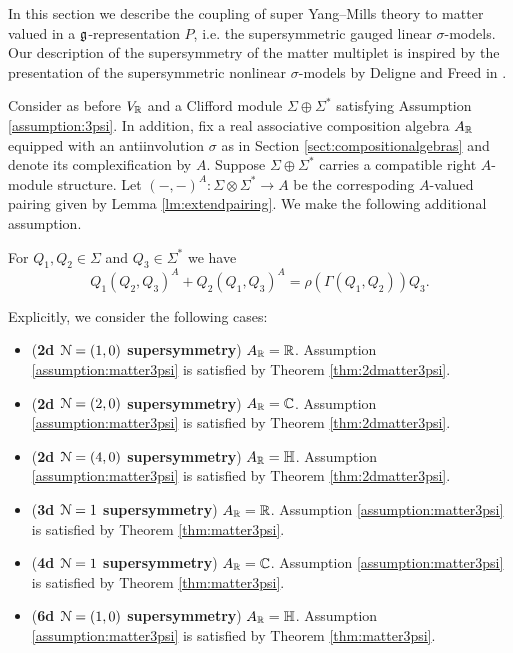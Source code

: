 \documentclass[10pt, oneside]{article}
\begin{document}
In this section we describe the coupling of super Yang--Mills theory to matter valued in a $\mathfrak g$-representation $P$, i.e. the supersymmetric gauged linear $\sigma$-models. Our description of the supersymmetry of the matter multiplet is inspired by the presentation of the supersymmetric nonlinear $\sigma$-models by Deligne and Freed in \cite[Chapter 3]{DeligneFreed}.

Consider as before $V_\mathbb R$ and a Clifford module $\Sigma\oplus \Sigma^*$ satisfying Assumption \ref{assumption:3psi}. In addition, fix a real associative composition algebra $A_\mathbb R$ equipped with an antiinvolution $\sigma$ as in Section \ref{sect:compositionalgebras} and denote its complexification by $A$. Suppose $\Sigma\oplus \Sigma^*$ carries a compatible right $A$-module structure. Let $(-, -)^A\colon \Sigma\otimes \Sigma^*\rightarrow A$ be the correspoding $A$-valued pairing given by Lemma \ref{lm:extendpairing}. We make the following additional assumption.

\begin{assumption}
For $Q_1, Q_2\in\Sigma$ and $Q_3\in\Sigma^*$ we have
\[Q_1(Q_2, Q_3)^A + Q_2(Q_1, Q_3)^A = \rho(\Gamma(Q_1, Q_2))Q_3.\]
\label{assumption:matter3psi}
\end{assumption}

Explicitly, we consider the following cases:
\begin{itemize}
\item (\textbf{2d $\mathcal N=(1, 0)$ supersymmetry}) $A_\mathbb R = \mathbb R$. Assumption \ref{assumption:matter3psi} is satisfied by Theorem \ref{thm:2dmatter3psi}.

\item (\textbf{2d $\mathcal N=(2, 0)$ supersymmetry}) $A_\mathbb R = \mathbb C$. Assumption \ref{assumption:matter3psi} is satisfied by Theorem \ref{thm:2dmatter3psi}.

\item (\textbf{2d $\mathcal N=(4, 0)$ supersymmetry}) $A_\mathbb R = \mathbb{H}$. Assumption \ref{assumption:matter3psi} is satisfied by Theorem \ref{thm:2dmatter3psi}.

\item (\textbf{3d $\mathcal N=1$ supersymmetry}) $A_\mathbb R = \mathbb R$. Assumption \ref{assumption:matter3psi} is satisfied by Theorem \ref{thm:matter3psi}.

\item (\textbf{4d $\mathcal N=1$ supersymmetry}) $A_\mathbb R = \mathbb C$. Assumption \ref{assumption:matter3psi} is satisfied by Theorem \ref{thm:matter3psi}.

\item (\textbf{6d $\mathcal N=(1, 0)$ supersymmetry}) $A_\mathbb R = \mathbb{H}$. Assumption \ref{assumption:matter3psi} is satisfied by Theorem \ref{thm:matter3psi}.
\end{itemize}
\end{document}

